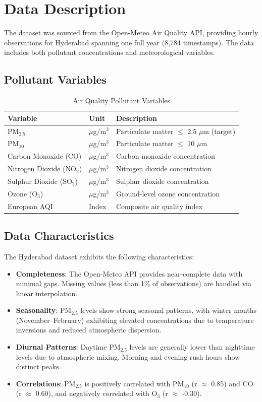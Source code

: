 \section{Data Description}

The dataset was sourced from the Open-Meteo Air Quality API, providing hourly observations for Hyderabad spanning one full year (8,784 timestamps). The data includes both pollutant concentrations and meteorological variables.

\subsection{Pollutant Variables}

\begin{table}[H]
\centering
\caption{Air Quality Pollutant Variables}
\label{tab:pollutants}
\begin{tabular}{lll}
\toprule
\textbf{Variable} & \textbf{Unit} & \textbf{Description} \\
\midrule
PM$_{2.5}$ & $\mu$g/m$^3$ & Particulate matter $\leq$ 2.5 $\mu$m (target) \\
PM$_{10}$ & $\mu$g/m$^3$ & Particulate matter $\leq$ 10 $\mu$m \\
Carbon Monoxide (CO) & $\mu$g/m$^3$ & Carbon monoxide concentration \\
Nitrogen Dioxide (NO$_2$) & $\mu$g/m$^3$ & Nitrogen dioxide concentration \\
Sulphur Dioxide (SO$_2$) & $\mu$g/m$^3$ & Sulphur dioxide concentration \\
Ozone (O$_3$) & $\mu$g/m$^3$ & Ground-level ozone concentration \\
European AQI & Index & Composite air quality index \\
\bottomrule
\end{tabular}
\end{table}

\subsection{Data Characteristics}

The Hyderabad dataset exhibits the following characteristics:

\begin{itemize}
    \item \textbf{Completeness}: The Open-Meteo API provides near-complete data with minimal gaps. Missing values (less than 1\% of observations) are handled via linear interpolation.
    \item \textbf{Seasonality}: PM$_{2.5}$ levels show strong seasonal patterns, with winter months (November--February) exhibiting elevated concentrations due to temperature inversions and reduced atmospheric dispersion.
    \item \textbf{Diurnal Patterns}: Daytime PM$_{2.5}$ levels are generally lower than nighttime levels due to atmospheric mixing. Morning and evening rush hours show distinct peaks.
    \item \textbf{Correlations}: PM$_{2.5}$ is positively correlated with PM$_{10}$ (r $\approx$ 0.85) and CO (r $\approx$ 0.60), and negatively correlated with O$_3$ (r $\approx$ -0.30).
\end{itemize}

